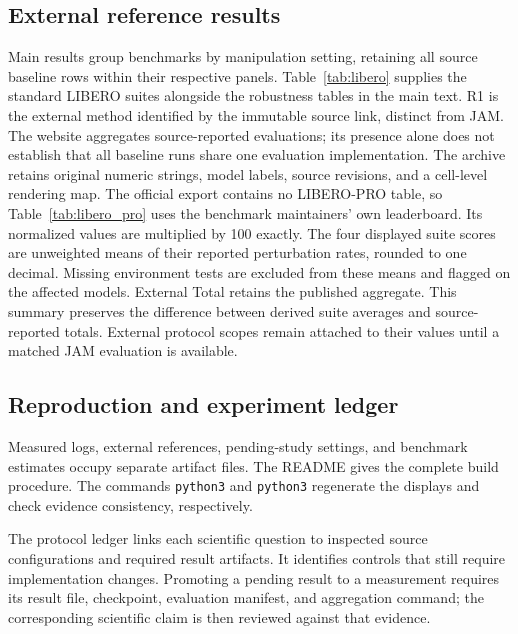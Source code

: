 \subsection{External reference results}
\label{app:reference}
Main results group benchmarks by manipulation setting, retaining all source baseline rows
within their respective panels.
Table~\ref{tab:libero} supplies the standard LIBERO suites alongside the robustness tables in the
main text. R1 is the external method identified by the immutable source link, distinct from JAM.
The website aggregates source-reported evaluations; its presence alone does not establish that
all baseline runs share one evaluation implementation. The archive retains original numeric strings,
model labels, source revisions, and a cell-level rendering map. The official export contains no
LIBERO-PRO table, so Table~\ref{tab:libero_pro} uses the benchmark maintainers' own leaderboard.
Its normalized values are multiplied by 100 exactly. The four displayed suite scores are
unweighted means of their reported perturbation rates, rounded to one decimal. Missing environment
tests are excluded from these means and flagged on the affected models. External Total retains the published
aggregate. This summary preserves the difference between derived suite averages and source-reported totals. External protocol scopes remain attached to their
values until a matched JAM evaluation is available.

\FloatBarrier

\subsection{Reproduction and experiment ledger}
Measured logs, external references, pending-study settings, and benchmark estimates occupy separate artifact files. The README gives the complete build procedure. The commands \texttt{python3}  and \texttt{python3}  regenerate the displays and check evidence consistency, respectively.

The protocol ledger links each scientific question to inspected source configurations and required
result artifacts. It identifies controls that still require implementation changes. Promoting a
pending result to a measurement requires its result file, checkpoint, evaluation manifest, and aggregation
command; the corresponding scientific claim is then reviewed against that evidence.

